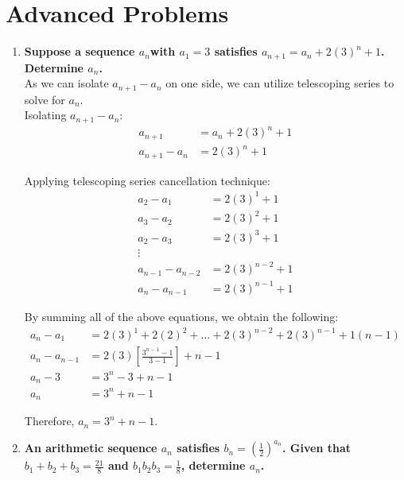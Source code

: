 \documentclass[12pt]{article}
\begin{document}
\section*{Advanced Problems}
\begin{enumerate}
    \item \textbf{Suppose a sequence ${a_n}$with $a_1 = 3$ satisfies $a_{n + 1} = a_n + 2(3)^n + 1$. Determine $a_n$.} \\
    
    As we can isolate $a_{n + 1} - a_{n}$ on one side, we can utilize telescoping series to solve for $a_n$. \\
    
    Isolating $a_{n + 1} - a_n$:
    \begin{align*}
        a_{n+1} & = a_n + 2(3)^n + 1 \\
        a_{n + 1} - a_n & = 2(3)^n + 1
    \end{align*}
    
    Applying telescoping series cancellation technique:
    \begin{align*}
        a_{2} - a_1 & = 2(3)^1 + 1 \\
        a_{3} - a_2 & = 2(3)^2 + 1 \\
        a_{2} - a_3 & = 2(3)^3 + 1 \\
        \vdots & \\
        a_{n-1} - a_{n - 2} & = 2(3)^{n - 2} + 1 \\
        a_{n} - a_{n - 1} & = 2(3)^{n - 1} + 1
    \end{align*}
    
    By summing all of the above equations, we obtain the following:
    \begin{align*}
        a_{n} - a_{1} & = 2(3)^1 + 2(2)^2 + \dots + 2(3)^{n - 2} + 2(3)^{n - 1} + 1(n - 1) \\
        a_{n} - a_{n - 1} & = 2(3)[\frac{3^{n - 1} - 1}{3 - 1}] + n - 1 \\
        a_{n} - 3 & = 3^n - 3 + n - 1 \\
        a_{n} & = 3^n + n - 1
    \end{align*}

    Therefore, $a_n = 3^n + n - 1$.
    
    \newpage

    \item \textbf{An arithmetic sequence ${a_n}$ satisfies $b_n = (\frac{1}{2})^{a_n}$. Given that $b_1 + b_2 + b_3 = \frac{21}{8}$ and $b_1b_2b_3 = \frac{1}{8}$, determine $a_n$.} \\
    

\end{enumerate}
\end{document}
